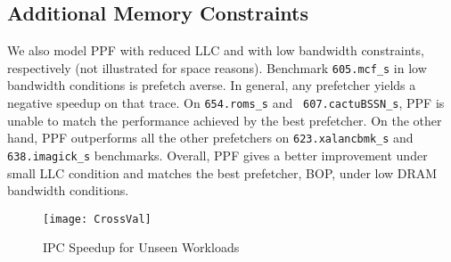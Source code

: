 
\subsection{Additional Memory Constraints}
\label{Results-AdditionalMem}


We also model PPF with reduced LLC and with low bandwidth constraints,
respectively (not illustrated for space reasons). Benchmark {\tt 605.mcf\_s}
in low bandwidth conditions is prefetch averse. In general, any prefetcher
yields a negative speedup on that trace. On {\tt 654.roms\_s} and {\tt
607.cactuBSSN\_s}, PPF is unable to match the performance achieved by the best
prefetcher. On the other hand, PPF outperforms all the other prefetchers on
{\tt 623.xalancbmk\_s} and {\tt 638.imagick\_s} benchmarks. Overall, PPF
gives a better improvement under small LLC condition and matches the best
prefetcher, BOP, under low DRAM bandwidth conditions.


\begin{figure}[ht]
\begin{adjustwidth}{-0.4cm}{}
\texttt{[image: CrossVal]}
\caption{IPC Speedup for Unseen Workloads}
\label{Fig:CrossVal}
\end{adjustwidth}
\end{figure}

